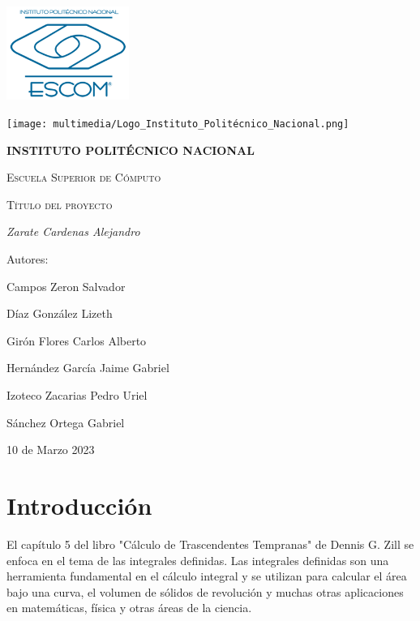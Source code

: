 \documentclass{article}
\begin{document}
  \begin{titlepage}
    {\includegraphics[width=0.3\textwidth]{multimedia/ESCOM-Logo.png}}
    \hfill
    {\texttt{[image: multimedia/Logo\_Instituto\_Politécnico\_Nacional.png]}\par}
    \vspace{1cm}
    \centering
    {\bfseries\LARGE  INSTITUTO POLIT\'ECNICO NACIONAL\par}
    \vspace{1cm}
    {\scshape\LARGE Escuela Superior de C\'omputo\par}
    \vspace{1cm}
    {\scshape\Huge T\'itulo del proyecto\par}
    \vspace{2cm}
    {\itshape\Large Zarate Cardenas Alejandro\par}
    \vfill
    {\Large Autores:\par}
    {\Large Campos Zeron Salvador\par}
    {\Large Díaz González Lizeth\par}
    {\Large Girón Flores Carlos Alberto\par}
    {\Large Hernández García Jaime Gabriel\par}
    {\Large Izoteco Zacarias Pedro Uriel\par}
    {\Large S\'anchez Ortega Gabriel\par}
    \vfill
    {\Large 10 de Marzo 2023 \par}
  \end{titlepage}

  \renewcommand*\contentsname{Índice}
  \tableofcontents
  \newpage
  \section{Introducción}
    El capítulo 5 del libro "Cálculo de Trascendentes Tempranas" de Dennis G. Zill se enfoca en el tema de las integrales definidas. Las integrales definidas son una herramienta fundamental en el cálculo integral y se utilizan para calcular el área bajo una curva, el volumen de sólidos de revolución y muchas otras aplicaciones en matemáticas, física y otras áreas de la ciencia.
\end{document}

